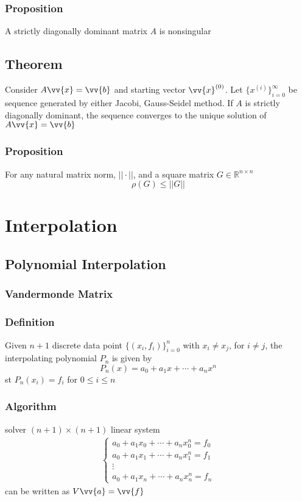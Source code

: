 \documentclass[11pt]{article}
\newcommand{\R}{{\mathbb{R}}}
\newcommand{\va}{\vv{a}}
\newcommand{\vb}{\vv{b}}
\newcommand{\vf}{\vv{f}}
\newcommand{\vx}{\vv{x}}
\begin{document}
\subsubsection{Proposition}
A strictly diagonally dominant matrix $A$ is nonsingular 
\subsection{Theorem}
Consider $A\vx=\vb$ and starting vector $\vx^{(0)}$. 
Let $\{x^{(i)}\}_{i=0}^{\infty}$ be sequence generated by either Jacobi, Gauss-Seidel method. 
If $A$ is strictly diagonally dominant, the sequence converges to the unique solution of $A\vx=\vb$
\subsubsection{Proposition}
For any natural matrix norm, $||\cdot||$, and a square matrix $G\in\R^{n\times n}$ \[\rho(G)\leq ||G||\]


\section{Interpolation}
\subsection{Polynomial Interpolation}
\subsubsection{Vandermonde Matrix}
\subsubsection*{Definition}
Given $n+1$ discrete data point $\{(x_i,f_i)\}_{i=0}^{n}$ with $x_i\neq x_j$, for $i\neq j$, the interpolating polynomial $P_n$ is given by 
\[P_n(x) = a_0+a_1x+\cdots+a_nx^n\]
st $P_n(x_i) = f_i$ for $0\leq i\leq n$
\subsubsection*{Algorithm}
solver $(n+1)\times(n+1)$ linear system 
\begin{align*}
\begin{cases}
  a_0+a_1x_0+\cdots+a_nx_0^n = f_0 \\
  a_0+a_1x_1+\cdots+a_nx_1^n = f_1 \\
  \vdots \\
  a_0+a_1x_n+\cdots+a_nx_n^n = f_n
\end{cases}
\end{align*}
can be written as $V\va = \vf$
\end{document}
